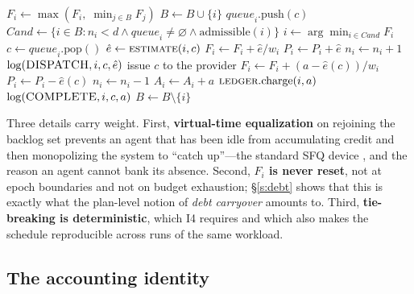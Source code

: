 \documentclass[letterpaper,11pt,leqno]{article}
\begin{document}
\begin{algorithm}[t]
\caption{Reconciled Virtual Time}
\label{alg:rvt}
\begin{algorithmic}[1]
        \State $F_i \gets \max(F_i,\; \min_{j \in B} F_j)$
    \EndIf
    \State $B \gets B \cup \{i\}$
    \State $\mathit{queue}_i.\mathrm{push}(c)$
    \State {}
\EndProcedure
\State
{}
    \State $\mathit{Cand} \gets \{ i \in B : n_i < d \land \mathit{queue}_i \neq \varnothing \land \mathrm{admissible}(i) \}$
        \State \Return
    \EndIf
    \State $i \gets \arg\min_{i \in \mathit{Cand}} F_i$ 
    \State $c \gets \mathit{queue}_i.\mathrm{pop}()$
    \State $\hat{e} \gets \textsc{estimate}(i, c)$
    \State $F_i \gets F_i + \hat{e} / w_i$
    \State $P_i \gets P_i + \hat{e}$
    \State $n_i \gets n_i + 1$
    \State $\log(\textsc{DISPATCH}, i, c, \hat{e})$ 
    \State issue $c$ to the provider
\EndProcedure
\State
{}
    \State $F_i \gets F_i + (a - \hat{e}(c)) / w_i$ 
    \State $P_i \gets P_i - \hat{e}(c)$
    \State $n_i \gets n_i - 1$
    \State $A_i \gets A_i + a$
    \State $\textsc{ledger}.\mathrm{charge}(i, a)$ 
    \State $\log(\textsc{COMPLETE}, i, c, a)$
        \State $B \gets B \setminus \{i\}$
    \EndIf
    \State {}
\EndProcedure
\end{algorithmic}
\end{algorithm}

Three details carry weight. First, \textbf{virtual-time equalization} on rejoining the backlog set prevents an agent that has been idle from accumulating credit and then monopolizing the system to ``catch up''---the standard SFQ device \citep{Goyal96}, and the reason an agent cannot bank its absence. Second, \textbf{$F_i$ is never reset}, not at epoch boundaries and not on budget exhaustion; \S\ref{s:debt} shows that this is exactly what the plan-level notion of \emph{debt carryover} amounts to. Third, \textbf{tie-breaking is deterministic}, which I4 requires and which also makes the schedule reproducible across runs of the same workload.

\subsection{The accounting identity}\label{s:identity}
\end{document}
